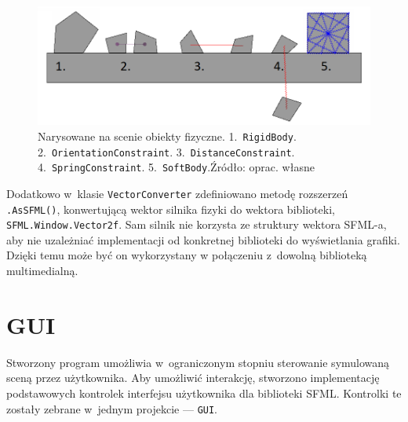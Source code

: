 \begin{figure}[h]
	\centering
	\includegraphics[width=0.9\linewidth]{images/drawables}
	\caption[Narysowane na scenie obiekty fizyczne ---\texttt{RigidBody}, \texttt{OrientationConstraint}, \texttt{DistanceConstraint}, \texttt{SpringConstraint}, \texttt{SoftBody}]{Narysowane na scenie obiekty fizyczne. 1.~\texttt{RigidBody}. 2.~\texttt{OrientationConstraint}. 3.~\texttt{DistanceConstraint}. 4.~\texttt{SpringConstraint}. 5.~\texttt{SoftBody}.\newline Źródło: oprac. własne}
	\label{fig:drawables}
\end{figure}

Dodatkowo w~klasie \verb|VectorConverter| zdefiniowano metodę rozszerzeń \verb|.AsSFML()|, konwertującą wektor silnika fizyki do wektora biblioteki, \verb|SFML.Window.Vector2f|. Sam silnik nie korzysta ze struktury wektora SFML-a, aby nie uzależniać implementacji od konkretnej biblioteki do wyświetlania grafiki. Dzięki temu może być on wykorzystany w połączeniu z~dowolną biblioteką multimedialną.







\section{GUI}
Stworzony program umożliwia w~ograniczonym stopniu sterowanie symulowaną sceną przez użytkownika. Aby umożliwić interakcję, stworzono implementację podstawowych kontrolek interfejsu użytkownika dla biblioteki SFML. Kontrolki te zostały zebrane w~jednym projekcie --- \texttt{GUI}.

